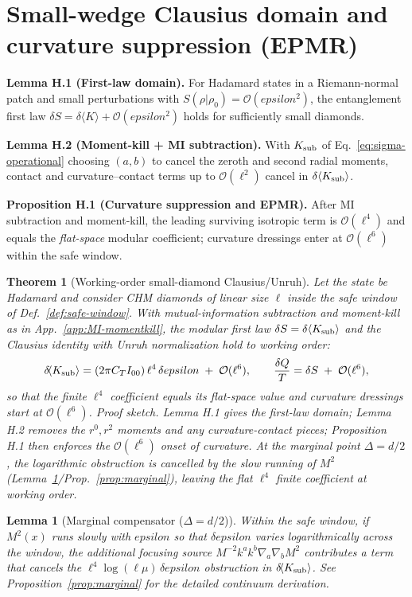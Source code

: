 \documentclass[aps,prd,onecolumn,superscriptaddress,nofootinbib]{revtex4-2}
\def\eps{epsilon}%
\newcommand{\eps}{\varepsilon}
\newtheorem{lemma}{Lemma}
\newtheorem{theorem}{Theorem}
\begin{document}
\section{Small-wedge Clausius domain and curvature suppression (EPMR)}
\label{app:epmr}
\noindent\textbf{Lemma H.1 (First-law domain).}
For Hadamard states in a Riemann-normal patch and small perturbations with $S(\rho|\rho_0)=\mathcal O(\eps^2)$, the entanglement first law
$\delta S=\delta\langle K\rangle+\mathcal O(\eps^2)$
holds for sufficiently small diamonds.

\medskip
\noindent\textbf{Lemma H.2 (Moment-kill + MI subtraction).}
With $K_{\rm sub}$ of Eq.~\eqref{eq:sigma-operational} choosing $(a,b)$ to cancel the zeroth and second radial moments, contact and curvature--contact terms up to $\mathcal O(\ell^2)$ cancel in $\delta\langle K_{\rm sub}\rangle$.

\medskip
\noindent\textbf{Proposition H.1 (Curvature suppression and EPMR).}
After MI subtraction and moment-kill, the leading surviving isotropic term is $\mathcal O(\ell^4)$ and equals the \emph{flat-space} modular coefficient; curvature dressings enter at $\mathcal O(\ell^6)$ within the safe window.

\begin{theorem}[Working-order small-diamond Clausius/Unruh]
\label{thm:A2-working}
Let the state be Hadamard and consider CHM diamonds of linear size $\ell$ inside the safe window of Def.~\ref{def:safe-window}. With mutual-information subtraction and moment-kill as in App.~\ref{app:MI-momentkill}, the modular first law $\delta S=\delta\langle K_{\rm sub}\rangle$ and the Clausius identity with Unruh normalization hold to working order:
\[
\delta\!\langle K_{\rm sub}\rangle
= (2\pi C_T I_{00})\,\ell^4\,\delta\eps \;+\; \mathcal O(\ell^6),
\qquad
\frac{\delta Q}{T}=\delta S \;+\; \mathcal O(\ell^6),
\]
so that the finite $\ell^4$ coefficient equals its flat-space value and curvature dressings start at $\mathcal O(\ell^6)$. \emph{Proof sketch.} Lemma H.1 gives the first-law domain; Lemma H.2 removes the $r^0,r^2$ moments and any curvature-contact pieces; Proposition H.1 then enforces the $\mathcal O(\ell^6)$ onset of curvature. At the marginal point $\Delta=d/2$, the logarithmic obstruction is cancelled by the slow running of $M^2$ (Lemma~\ref{lem:A2-marginal}/Prop.~\ref{prop:marginal}), leaving the flat $\ell^4$ finite coefficient at working order.
\end{theorem}

\begin{lemma}[Marginal compensator ($\Delta=d/2$)]
\label{lem:A2-marginal}
Within the safe window, if $M^2(x)$ runs slowly with $\eps$ so that $\delta\eps$ varies logarithmically across the window, the additional focusing source $M^{-2}k^a k^b\nabla_a\nabla_b M^2$ contributes a term that cancels the $\ell^4\log(\ell\mu)\,\delta\eps$ obstruction in $\delta\!\langle K_{\rm sub}\rangle$. See Proposition~\ref{prop:marginal} for the detailed continuum derivation.
\end{lemma}
\end{document}
